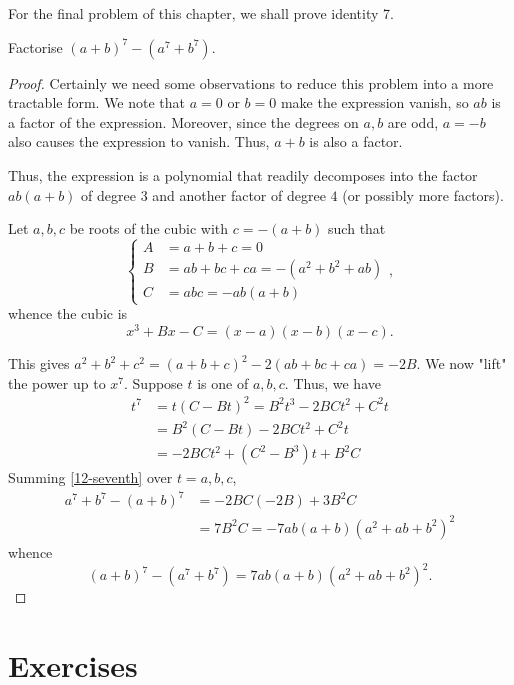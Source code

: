 \documentclass[../jarvis.tex]{subfiles}
\begin{document}
For the final problem of this chapter, we shall prove identity 7.
\begin{example}[Classic]
    Factorise $(a+b)^7-(a^7+b^7)$.
\end{example}
\begin{proof}
    Certainly we need some observations to reduce this problem into a more tractable form. We note that $a=0$ or $b=0$ make the expression vanish, so $ab$ is a factor of the expression. Moreover, since the degrees on $a, b$ are odd, $a=-b$ also causes the expression to vanish. Thus, $a+b$ is also a factor.

    Thus, the expression is a polynomial that readily decomposes into the factor $ab(a+b)$ of degree $3$ and another factor of degree $4$ (or possibly more factors).

    Let $a,b,c$ be roots of the cubic with $c=-(a+b)$ such that
    $$\begin{cases}
        A&=a+b+c=0 \\
        B&=ab+bc+ca=-(a^2+b^2+ab) \\
        C&=abc=-ab(a+b)
    \end{cases},$$
    whence the cubic is $$x^3+Bx-C=(x-a)(x-b)(x-c).$$
    
    This gives $a^2+b^2+c^2=(a+b+c)^2-2(ab+bc+ca)=-2B$. We now "lift" the power up to $x^7$. Suppose $t$ is one of $a,b,c$. Thus, we have
    \begin{align}
        t^7&=t(C-Bt)^2=B^2t^3-2BCt^2+C^2t \\
        &=B^2(C-Bt)-2BCt^2+C^2t \\
        &=-2BCt^2+(C^2-B^3)t+B^2C \label{12-seventh}
    \end{align}
    Summing \eqref{12-seventh} over $t=a,b,c$,
    \begin{align*}
        a^7+b^7-(a+b)^7&=-2BC(-2B)+3B^2C\\
        &=7B^2C=-7ab(a+b)(a^2+ab+b^2)^2
    \end{align*}
    whence $$(a+b)^7-(a^7+b^7)=7ab(a+b)(a^2+ab+b^2)^2.$$
\end{proof}

\section{Exercises}
\subsection{}
\end{document}
